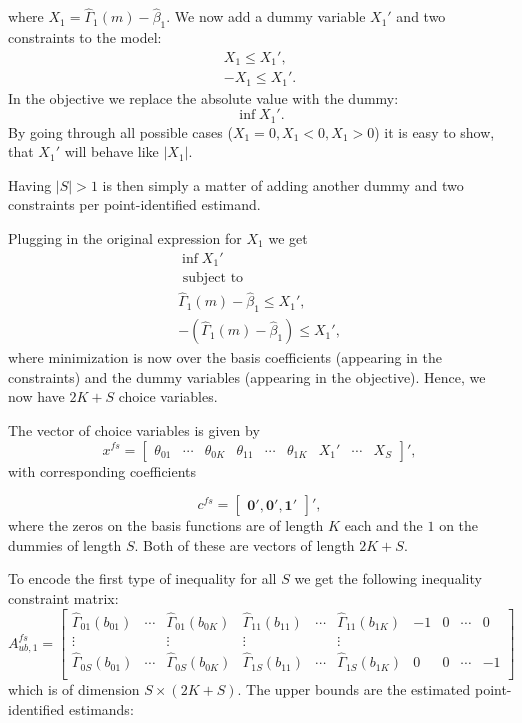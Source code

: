 \documentclass[12pt,a4paper,english]{article} %
\numberwithin{equation}{section}
\theoremstyle{definition}
\theoremstyle{remark}
\theoremstyle{plain}
\begin{document}
where $X_1 = \hat{\Gamma}_1(m) - \hat{\beta}_1$.
We now add a dummy variable $X_1'$ and two constraints to the model:
\begin{align*}
  X_1 \leq X_1', \\
  -X_1 \leq X_1'.
\end{align*}
In the objective we replace the absolute value with the dummy:
\begin{equation*}
  \inf X_1'.
\end{equation*}
By going through all possible cases ($X_1=0, X_1<0, X_1>0$) it is easy to show,
that $X_1'$ will behave like $|X_1|$.

Having $|S|>1$ is then simply a matter of adding another dummy and two constraints per point-identified estimand.

Plugging in the original expression for $X_1$ we get
\begin{align*}
  \inf X_1' \\
  \text{ subject to }\\
  \hat{\Gamma}_1(m) - \hat{\beta}_1 \leq X_1', \\
  -(\hat{\Gamma}_1(m) - \hat{\beta}_1) \leq X_1',
\end{align*}
where minimization is now over the basis coefficients (appearing in the constraints) and the dummy variables (appearing in the objective).
Hence, we now have $2K + S$ choice variables.

The vector of choice variables is given by
\begin{equation*}
  x^{fs} =
  \begin{bmatrix}
     \theta_{01} & \cdots & \theta_{0K} & \theta_{11} & \cdots & \theta_{1K} & X_1' & \cdots & X_{S}
  \end{bmatrix}',
\end{equation*}
with corresponding coefficients

\begin{equation*}
  c^{fs} =
  \begin{bmatrix}
     \mathbf{0}', \mathbf{0}', \mathbf{1}'
  \end{bmatrix}',
\end{equation*}
where the zeros on the basis functions are of length $K$ each and the $1$ on the dummies of length $S$.
Both of these are vectors of length $2K + S$.


To encode the first type of inequality for all $S$ we get the following inequality constraint matrix:
\begin{equation*}
  A_{ub, 1}^{fs} =
  \begin{bmatrix}
    \hat{\Gamma}_{01}(b_{01}) & \cdots & \hat{\Gamma}_{01}(b_{0K}) & \hat{\Gamma}_{11}(b_{11}) & \cdots & \hat{\Gamma}_{11}(b_{1K}) & -1 & 0 & \cdots & 0 \\
    \vdots & & \vdots & \vdots &  & \vdots & \\
    \hat{\Gamma}_{0S}(b_{01}) & \cdots & \hat{\Gamma}_{0S}(b_{0K}) & \hat{\Gamma}_{1S}(b_{11}) & \cdots & \hat{\Gamma}_{1S}(b_{1K}) & 0 & 0 & \cdots & -1 \\
  \end{bmatrix}
\end{equation*}
which is of dimension $S\times (2K + S)$. The upper bounds are the estimated point-identified estimands:
\end{document}
